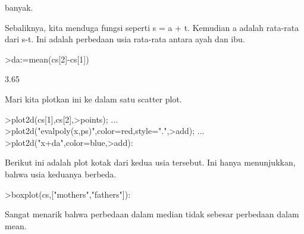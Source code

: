\documentclass[a4paper,10pt]{article}
\begin{document}
\begin{eulernotebook}
\begin{eulercomment}
\begin{eulercomment}
\begin{eulercomment}
\begin{eulercomment}
\begin{eulercomment}
\begin{eulercomment}
\begin{eulercomment}
\begin{eulercomment}
\begin{eulercomment}
\begin{eulercomment}
\begin{eulercomment}
\begin{eulercomment}
\begin{eulercomment}
\begin{eulercomment}
\begin{eulercomment}
\begin{eulercomment}
\begin{eulercomment}
\begin{eulercomment}
\begin{eulercomment}
\begin{eulercomment}
\begin{eulercomment}
\begin{eulercomment}
\begin{eulercomment}
\begin{eulercomment}
\begin{eulercomment}
\begin{eulercomment}
\begin{eulercomment}
\begin{eulercomment}
\begin{eulercomment}
\begin{eulercomment}
\begin{eulercomment}
\begin{eulercomment}
\begin{eulercomment}
\begin{eulercomment}
\begin{eulercomment}
\begin{eulercomment}
\begin{eulercomment}
\begin{eulercomment}
\begin{eulercomment}
\begin{eulercomment}
\begin{eulercomment}
\begin{eulercomment}
\begin{eulercomment}
\begin{eulercomment}
\begin{eulercomment}
banyak.

Sebaliknya, kita menduga fungsi seperti s = a + t. Kemudian a adalah
rata-rata dari s-t. Ini adalah perbedaan usia rata-rata antara ayah
dan ibu.
\end{eulercomment}
\begin{eulerprompt}
>da:=mean(cs[2]-cs[1])
\end{eulerprompt}
\begin{euleroutput}
  3.65
\end{euleroutput}
\begin{eulercomment}
Mari kita plotkan ini ke dalam satu scatter plot.
\end{eulercomment}
\begin{eulerprompt}
>plot2d(cs[1],cs[2],>points);  ...
>plot2d("evalpoly(x,ps)",color=red,style=".",>add);  ...
>plot2d("x+da",color=blue,>add):
\end{eulerprompt}
\begin{eulercomment}
Berikut ini adalah plot kotak dari kedua usia tersebut. Ini hanya
menunjukkan, bahwa usia keduanya berbeda.
\end{eulercomment}
\begin{eulerprompt}
>boxplot(cs,["mothers","fathers"]):
\end{eulerprompt}
\begin{eulercomment}
Sangat menarik bahwa perbedaan dalam median tidak sebesar perbedaan
dalam mean.
\end{eulercomment}

\end{eulercomment}
\end{eulercomment}
\end{eulercomment}
\end{eulercomment}
\end{eulercomment}
\end{eulercomment}
\end{eulercomment}
\end{eulercomment}
\end{eulercomment}
\end{eulercomment}
\end{eulercomment}
\end{eulercomment}
\end{eulercomment}
\end{eulercomment}
\end{eulercomment}
\end{eulercomment}
\end{eulercomment}
\end{eulercomment}
\end{eulercomment}
\end{eulercomment}
\end{eulercomment}
\end{eulercomment}
\end{eulercomment}
\end{eulercomment}
\end{eulercomment}
\end{eulercomment}
\end{eulercomment}
\end{eulercomment}
\end{eulercomment}
\end{eulercomment}
\end{eulercomment}
\end{eulercomment}
\end{eulercomment}
\end{eulercomment}
\end{eulercomment}
\end{eulercomment}
\end{eulercomment}
\end{eulercomment}
\end{eulercomment}
\end{eulercomment}
\end{eulercomment}
\end{eulercomment}
\end{eulercomment}
\end{eulercomment}
\end{eulernotebook}
\end{document}
